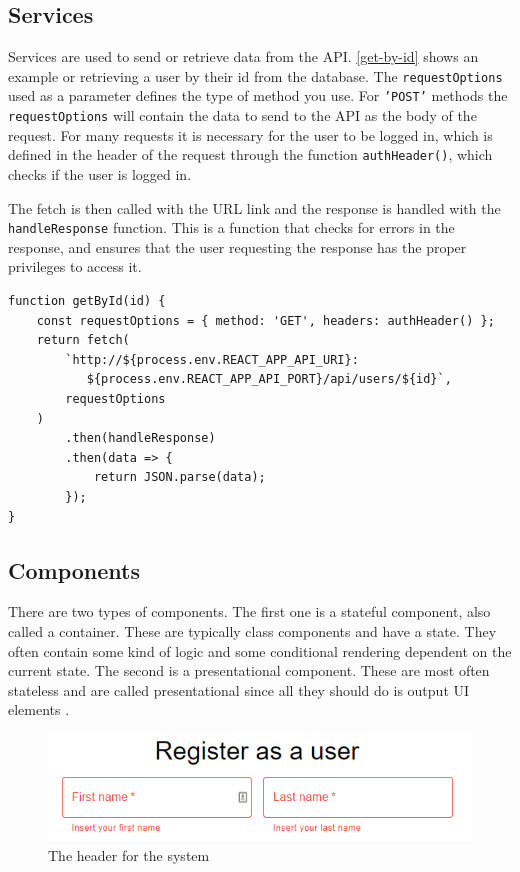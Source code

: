 \subsection{Services}
Services are used to send or retrieve data from the API. 
\autoref{get-by-id} shows an example or retrieving a user by their id from the database.
The \texttt{requestOptions} used as a parameter defines the type of method you use.
For \texttt{'POST'} methods the \texttt{requestOptions} will contain the data to send to the API as the body of the request.
For many requests it is necessary for the user to be logged in, which is defined in the header of the request through the function \texttt{authHeader()}, which checks if the user is logged in.

The fetch is then called with the URL link and the response is handled with the \texttt{handleResponse} function. 
This is a function that checks for errors in the response, and ensures that the user requesting the response has the proper privileges to access it.

\begin{lstlisting}[caption={Function to get a user by ID.}, captionpos=b, label={get-by-id}]
function getById(id) {
	const requestOptions = { method: 'GET', headers: authHeader() };
	return fetch(
        `http://${process.env.REACT_APP_API_URI}:
           ${process.env.REACT_APP_API_PORT}/api/users/${id}`,
		requestOptions
	)
		.then(handleResponse)
		.then(data => {
			return JSON.parse(data);
		});
}
\end{lstlisting}

\subsection{Components}
There are two types of components. 
The first one is a stateful component, also called a container.
These are typically class components and have a state.
They often contain some kind of logic and some conditional rendering dependent on the current state.
The second is a presentational component.
These are most often stateless and are called presentational since all they should do is output UI elements \cite{Vumbula-react}.

\begin{figure}[H]
    \includegraphics[width=\linewidth]{figures/create-user-error.png}
    \caption{The header for the system}
    \label{fig:create-user-error}
\end{figure}

